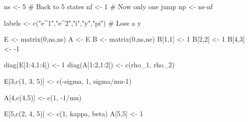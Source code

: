 \documentclass[
  letterpaper,
]{book}
\newenvironment{Shaded}{\begin{snugshade}}{\end{snugshade}}
\newcommand{\CommentTok}[1]{\textcolor[rgb]{0.37,0.37,0.37}{#1}}
\newcommand{\DecValTok}[1]{\textcolor[rgb]{0.68,0.00,0.00}{#1}}
\newcommand{\FunctionTok}[1]{\textcolor[rgb]{0.28,0.35,0.67}{#1}}
\newcommand{\NormalTok}[1]{\textcolor[rgb]{0.00,0.23,0.31}{#1}}
\newcommand{\OtherTok}[1]{\textcolor[rgb]{0.00,0.23,0.31}{#1}}
\newcommand{\SpecialCharTok}[1]{\textcolor[rgb]{0.37,0.37,0.37}{#1}}
\newcommand{\StringTok}[1]{\textcolor[rgb]{0.13,0.47,0.30}{#1}}
\begin{document}
\begin{Shaded}
\begin{Highlighting}[]
\NormalTok{ns }\OtherTok{\textless{}{-}} \DecValTok{5}      \CommentTok{\# Back to 5 states}
\NormalTok{nf }\OtherTok{\textless{}{-}} \DecValTok{1}      \CommentTok{\# Now only one jump}
\NormalTok{np }\OtherTok{\textless{}{-}}\NormalTok{ ns}\SpecialCharTok{{-}}\NormalTok{nf}

\NormalTok{labels }\OtherTok{\textless{}{-}} \FunctionTok{c}\NormalTok{(}\StringTok{"e\^{}1"}\NormalTok{,}\StringTok{"e\^{}2"}\NormalTok{,}\StringTok{"i"}\NormalTok{,}\StringTok{"y"}\NormalTok{,}\StringTok{"pi"}\NormalTok{) }\CommentTok{\# Lose a y}

\NormalTok{E }\OtherTok{\textless{}{-}} \FunctionTok{matrix}\NormalTok{(}\DecValTok{0}\NormalTok{,ns,ns)}
\NormalTok{A }\OtherTok{\textless{}{-}}\NormalTok{ E}
\NormalTok{B }\OtherTok{\textless{}{-}} \FunctionTok{matrix}\NormalTok{(}\DecValTok{0}\NormalTok{,ns,ne)}
\NormalTok{B[}\DecValTok{1}\NormalTok{,}\DecValTok{1}\NormalTok{] }\OtherTok{\textless{}{-}} \DecValTok{1}
\NormalTok{B[}\DecValTok{2}\NormalTok{,}\DecValTok{2}\NormalTok{] }\OtherTok{\textless{}{-}} \DecValTok{1}
\NormalTok{B[}\DecValTok{4}\NormalTok{,}\DecValTok{3}\NormalTok{] }\OtherTok{\textless{}{-}} \SpecialCharTok{{-}}\DecValTok{1}

\FunctionTok{diag}\NormalTok{(E[}\DecValTok{1}\SpecialCharTok{:}\DecValTok{4}\NormalTok{,}\DecValTok{1}\SpecialCharTok{:}\DecValTok{4}\NormalTok{]) }\OtherTok{\textless{}{-}} \DecValTok{1}
\FunctionTok{diag}\NormalTok{(A[}\DecValTok{1}\SpecialCharTok{:}\DecValTok{2}\NormalTok{,}\DecValTok{1}\SpecialCharTok{:}\DecValTok{2}\NormalTok{]) }\OtherTok{\textless{}{-}} \FunctionTok{c}\NormalTok{(rho\_1, rho\_2)}

\NormalTok{E[}\DecValTok{3}\NormalTok{,}\FunctionTok{c}\NormalTok{(}\DecValTok{1}\NormalTok{, }\DecValTok{3}\NormalTok{, }\DecValTok{5}\NormalTok{)]  }\OtherTok{\textless{}{-}} \FunctionTok{c}\NormalTok{(}\SpecialCharTok{{-}}\NormalTok{sigma, }\DecValTok{1}\NormalTok{, sigma}\SpecialCharTok{/}\NormalTok{mu}\DecValTok{{-}1}\NormalTok{)}

\NormalTok{A[}\DecValTok{4}\NormalTok{,}\FunctionTok{c}\NormalTok{(}\DecValTok{4}\NormalTok{,}\DecValTok{5}\NormalTok{)]      }\OtherTok{\textless{}{-}} \FunctionTok{c}\NormalTok{(}\DecValTok{1}\NormalTok{, }\SpecialCharTok{{-}}\DecValTok{1}\SpecialCharTok{/}\NormalTok{mu)}

\NormalTok{E[}\DecValTok{5}\NormalTok{,}\FunctionTok{c}\NormalTok{(}\DecValTok{2}\NormalTok{, }\DecValTok{4}\NormalTok{, }\DecValTok{5}\NormalTok{)]  }\OtherTok{\textless{}{-}} \FunctionTok{c}\NormalTok{(}\DecValTok{1}\NormalTok{, kappa, beta)}
\NormalTok{A[}\DecValTok{5}\NormalTok{,}\DecValTok{5}\NormalTok{]           }\OtherTok{\textless{}{-}} \DecValTok{1}
\end{Highlighting}
\end{Shaded}
\end{document}
